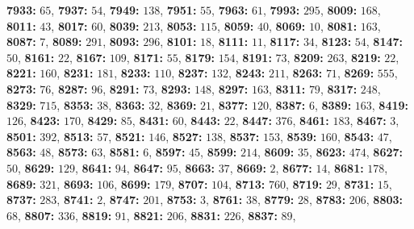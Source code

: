 \textsf{\bfseries 7933:} $65$, \textsf{\bfseries 7937:} $54$, \textsf{\bfseries 7949:} $138$, \textsf{\bfseries 7951:} $55$, \textsf{\bfseries 7963:} $61$, \textsf{\bfseries 7993:} $295$, \textsf{\bfseries 8009:} $168$, \textsf{\bfseries 8011:} $43$, \textsf{\bfseries 8017:} $60$, \textsf{\bfseries 8039:} $213$, \textsf{\bfseries 8053:} $115$, \textsf{\bfseries 8059:} $40$, \textsf{\bfseries 8069:} $10$, \textsf{\bfseries 8081:} $163$, \textsf{\bfseries 8087:} $7$, \textsf{\bfseries 8089:} $291$, \textsf{\bfseries 8093:} $296$, \textsf{\bfseries 8101:} $18$, \textsf{\bfseries 8111:} $11$, \textsf{\bfseries 8117:} $34$, \textsf{\bfseries 8123:} $54$, \textsf{\bfseries 8147:} $50$, \textsf{\bfseries 8161:} $22$, \textsf{\bfseries 8167:} $109$, \textsf{\bfseries 8171:} $55$, \textsf{\bfseries 8179:} $154$, \textsf{\bfseries 8191:} $73$, \textsf{\bfseries 8209:} $263$, \textsf{\bfseries 8219:} $22$, \textsf{\bfseries 8221:} $160$, \textsf{\bfseries 8231:} $181$, \textsf{\bfseries 8233:} $110$, \textsf{\bfseries 8237:} $132$, \textsf{\bfseries 8243:} $211$, \textsf{\bfseries 8263:} $71$, \textsf{\bfseries 8269:} $555$, \textsf{\bfseries 8273:} $76$, \textsf{\bfseries 8287:} $96$, \textsf{\bfseries 8291:} $73$, \textsf{\bfseries 8293:} $148$, \textsf{\bfseries 8297:} $163$, \textsf{\bfseries 8311:} $79$, \textsf{\bfseries 8317:} $248$, \textsf{\bfseries 8329:} $715$, \textsf{\bfseries 8353:} $38$, \textsf{\bfseries 8363:} $32$, \textsf{\bfseries 8369:} $21$, \textsf{\bfseries 8377:} $120$, \textsf{\bfseries 8387:} $6$, \textsf{\bfseries 8389:} $163$, \textsf{\bfseries 8419:} $126$, \textsf{\bfseries 8423:} $170$, \textsf{\bfseries 8429:} $85$, \textsf{\bfseries 8431:} $60$, \textsf{\bfseries 8443:} $22$, \textsf{\bfseries 8447:} $376$, \textsf{\bfseries 8461:} $183$, \textsf{\bfseries 8467:} $3$, \textsf{\bfseries 8501:} $392$, \textsf{\bfseries 8513:} $57$, \textsf{\bfseries 8521:} $146$, \textsf{\bfseries 8527:} $138$, \textsf{\bfseries 8537:} $153$, \textsf{\bfseries 8539:} $160$, \textsf{\bfseries 8543:} $47$, \textsf{\bfseries 8563:} $48$, \textsf{\bfseries 8573:} $63$, \textsf{\bfseries 8581:} $6$, \textsf{\bfseries 8597:} $45$, \textsf{\bfseries 8599:} $214$, \textsf{\bfseries 8609:} $35$, \textsf{\bfseries 8623:} $474$, \textsf{\bfseries 8627:} $50$, \textsf{\bfseries 8629:} $129$, \textsf{\bfseries 8641:} $94$, \textsf{\bfseries 8647:} $95$, \textsf{\bfseries 8663:} $37$, \textsf{\bfseries 8669:} $2$, \textsf{\bfseries 8677:} $14$, \textsf{\bfseries 8681:} $178$, \textsf{\bfseries 8689:} $321$, \textsf{\bfseries 8693:} $106$, \textsf{\bfseries 8699:} $179$, \textsf{\bfseries 8707:} $104$, \textsf{\bfseries 8713:} $760$, \textsf{\bfseries 8719:} $29$, \textsf{\bfseries 8731:} $15$, \textsf{\bfseries 8737:} $283$, \textsf{\bfseries 8741:} $2$, \textsf{\bfseries 8747:} $201$, \textsf{\bfseries 8753:} $3$, \textsf{\bfseries 8761:} $38$, \textsf{\bfseries 8779:} $28$, \textsf{\bfseries 8783:} $206$, \textsf{\bfseries 8803:} $68$, \textsf{\bfseries 8807:} $336$, \textsf{\bfseries 8819:} $91$, \textsf{\bfseries 8821:} $206$, \textsf{\bfseries 8831:} $226$, \textsf{\bfseries 8837:} $89$, 
